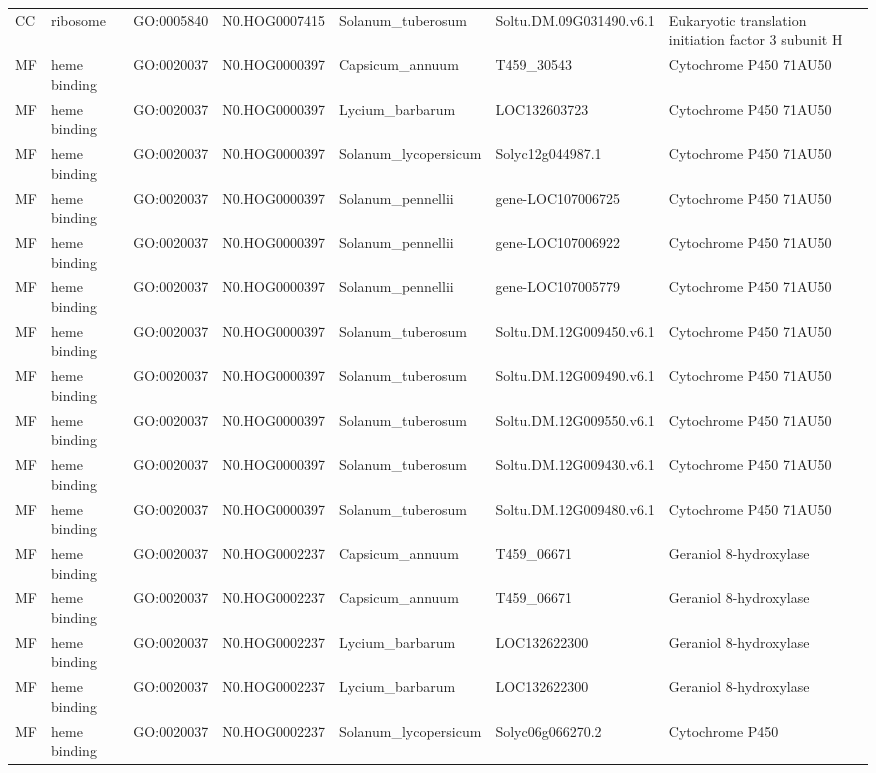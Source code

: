 \begin{table}
\begin{tabular}[t]{lllllll}
CC & ribosome & GO:0005840 & N0.HOG0007415 & Solanum\_tuberosum & Soltu.DM.09G031490.v6.1 & Eukaryotic translation initiation factor 3 subunit H\\
MF & heme binding & GO:0020037 & N0.HOG0000397 & Capsicum\_annuum & T459\_30543 & Cytochrome P450 71AU50\\
MF & heme binding & GO:0020037 & N0.HOG0000397 & Lycium\_barbarum & LOC132603723 & Cytochrome P450 71AU50\\
MF & heme binding & GO:0020037 & N0.HOG0000397 & Solanum\_lycopersicum & Solyc12g044987.1 & Cytochrome P450 71AU50\\
MF & heme binding & GO:0020037 & N0.HOG0000397 & Solanum\_pennellii & gene-LOC107006725 & Cytochrome P450 71AU50\\
MF & heme binding & GO:0020037 & N0.HOG0000397 & Solanum\_pennellii & gene-LOC107006922 & Cytochrome P450 71AU50\\
MF & heme binding & GO:0020037 & N0.HOG0000397 & Solanum\_pennellii & gene-LOC107005779 & Cytochrome P450 71AU50\\
MF & heme binding & GO:0020037 & N0.HOG0000397 & Solanum\_tuberosum & Soltu.DM.12G009450.v6.1 & Cytochrome P450 71AU50\\
MF & heme binding & GO:0020037 & N0.HOG0000397 & Solanum\_tuberosum & Soltu.DM.12G009490.v6.1 & Cytochrome P450 71AU50\\
MF & heme binding & GO:0020037 & N0.HOG0000397 & Solanum\_tuberosum & Soltu.DM.12G009550.v6.1 & Cytochrome P450 71AU50\\
MF & heme binding & GO:0020037 & N0.HOG0000397 & Solanum\_tuberosum & Soltu.DM.12G009430.v6.1 & Cytochrome P450 71AU50\\
MF & heme binding & GO:0020037 & N0.HOG0000397 & Solanum\_tuberosum & Soltu.DM.12G009480.v6.1 & Cytochrome P450 71AU50\\
MF & heme binding & GO:0020037 & N0.HOG0002237 & Capsicum\_annuum & T459\_06671 & Geraniol 8-hydroxylase\\
MF & heme binding & GO:0020037 & N0.HOG0002237 & Capsicum\_annuum & T459\_06671 & Geraniol 8-hydroxylase\\
MF & heme binding & GO:0020037 & N0.HOG0002237 & Lycium\_barbarum & LOC132622300 & Geraniol 8-hydroxylase\\
MF & heme binding & GO:0020037 & N0.HOG0002237 & Lycium\_barbarum & LOC132622300 & Geraniol 8-hydroxylase\\
MF & heme binding & GO:0020037 & N0.HOG0002237 & Solanum\_lycopersicum & Solyc06g066270.2 & Cytochrome P450\\

\end{tabular}
\end{table}
